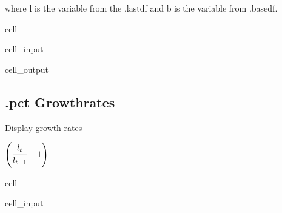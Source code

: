 \documentclass[letterpaper,10pt,english]{jupyterBook}
\begin{document}
\sphinxAtStartPar
where l is the variable from the .lastdf and b is the variable from .basedf.

\begin{sphinxuseclass}{cell}\begin{sphinxVerbatimInput}

\begin{sphinxuseclass}{cell_input}
\begin{sphinxVerbatim}[commandchars=\\\{\}]
\PYG{p}{[}\PYG{p}{]}
\end{sphinxVerbatim}

\end{sphinxuseclass}\end{sphinxVerbatimInput}
\begin{sphinxVerbatimOutput}

\begin{sphinxuseclass}{cell_output}
\noindent{}

\end{sphinxuseclass}\end{sphinxVerbatimOutput}

\end{sphinxuseclass}

\subsection{.pct  Growthrates}
\label{\detokenize{content/notebooks/modelflow_features:pct-growthrates}}
\sphinxAtStartPar
Display growth rates

\sphinxAtStartPar
\(\left(\cfrac{l_t}{l_{t-1}}-1\right )\)

\begin{sphinxuseclass}{cell}\begin{sphinxVerbatimInput}

\begin{sphinxuseclass}{cell_input}
\begin{sphinxVerbatim}[commandchars=\\\{\}]
\PYG{p}{[}\PYG{p}{]}
\end{sphinxVerbatim}

\end{sphinxuseclass}\end{sphinxVerbatimInput}

\end{sphinxuseclass}
\end{document}
